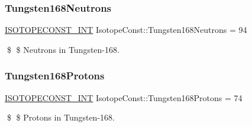 \subsubsection{\texorpdfstring{Tungsten168\+Neutrons}{Tungsten168Neutrons}}
{\footnotesize\ttfamily \mbox{\hyperlink{group___isotope_const-_macros_ga5f18360b3e99483a35c32d789e62621c}{I\+S\+O\+T\+O\+P\+E\+C\+O\+N\+S\+T\+\_\+\+I\+NT}} Isotope\+Const\+::\+Tungsten168\+Neutrons = 94}

\$ \$ Neutrons in Tungsten-\/168. \mbox{\label{group___isotope_const-_tungsten-_w168_ga31621d9ba60e0d494798c278bb1f2da0}} 
\subsubsection{\texorpdfstring{Tungsten168\+Protons}{Tungsten168Protons}}
{\footnotesize\ttfamily \mbox{\hyperlink{group___isotope_const-_macros_ga5f18360b3e99483a35c32d789e62621c}{I\+S\+O\+T\+O\+P\+E\+C\+O\+N\+S\+T\+\_\+\+I\+NT}} Isotope\+Const\+::\+Tungsten168\+Protons = 74}

\$ \$ Protons in Tungsten-\/168. 
